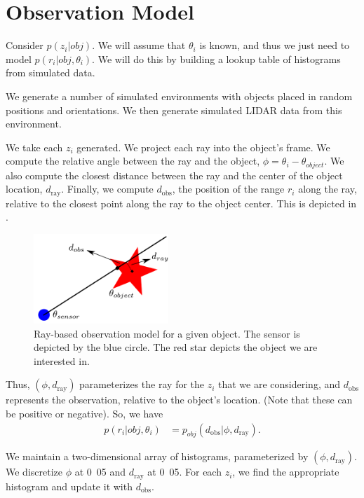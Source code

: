 \section{Observation Model}

Consider $p( z_i | obj)$. We will assume that $\theta_i$ is known, and thus we
just need to model $p( r_i | obj, \theta_i)$. We will do this by building a
lookup table of histograms from simulated data.

We generate a number of simulated environments with objects placed in random
positions and orientations. We then generate simulated LIDAR data from this
environment.

We take each $z_i$ generated. We project each ray into the object's frame. We
compute the relative angle between the ray and the object, $\phi = \theta_i -
\theta_{object}$. We also compute the closest distance between the ray and the
center of the object location, $d_{\text{ray}}$. Finally, we compute
$d_{\text{obs}}$, the position of the range $r_i$ along the ray, relative to the
closest point along the ray to the object center. This is depicted in
.
%
\begin{figure}
  \centering
  \includegraphics[width=2in]{figures/ray_model.pdf}
  \caption{Ray-based observation model for a given object. The sensor is
    depicted by the blue circle. The red star depicts the object we are
    interested in.}
  \label{fig:obs_model}
\end{figure}
%
Thus, $(\phi, d_{\text{ray}})$ parameterizes the ray for the $z_i$ that we are
considering, and $d_{\text{obs}}$ represents the observation, relative to the
object's location. (Note that these can be positive or negative). So, we have
%
\begin{align}
  p( r_i | obj, \theta_i) &=
    p_{obj}( d_{\text{obs}} | \phi, d_{\text{ray}} )
  \text{.}
\end{align}

We maintain a two-dimensional array of histograms, parameterized by $(\phi,
d_{\text{ray}})$. We discretize $\phi$ at \unit{0.05}{\rad} and
$d_{\text{ray}}$ at \unit{0.05}{\m}. For each $z_i$, we find the appropriate
histogram and update it with $d_{\text{obs}}$.


